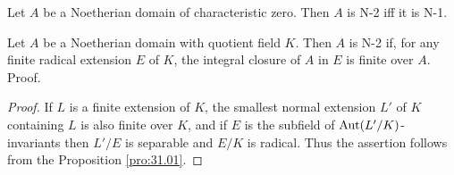 \documentclass[../main]{subfiles}
\begin{document}
\begin{corollary}\label{cor:31.01} Let $A$ be a Noetherian domain of characteristic zero. Then $A$ is N-2 iff it is N-1.
\end{corollary}

\begin{corollary}\label{cor:31.02} Let $A$ be a Noetherian domain with quotient field $K$. Then $A$ is N-2 if, for any finite radical extension $E$ of $K$, the integral closure of $A$ in $E$ is finite over $A$. Proof. 
\end{corollary}
\begin{proof}
If $L$ is a finite extension of $K$, the smallest normal extension $L'$ of $K$ containing $L$ is also finite over $K$, and if $E$ is the subfield of $\operatorname{Aut}(L' / K)$-invariants then $L' / E$ is separable and $E / K$ is radical. Thus the assertion follows from the Proposition \ref{pro:31.01}.
\end{proof}
\end{document}
